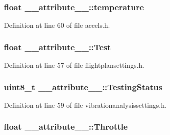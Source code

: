 \hypertarget{struct____attribute_____ad8ae98d5256d8f133d5e71db56f72cfe}{
\subsubsection[{temperature}]{\setlength{\rightskip}{0pt plus 5cm}float {\bf \-\_\-\-\_\-attribute\-\_\-\-\_\-\-::temperature}}}\label{struct____attribute_____ad8ae98d5256d8f133d5e71db56f72cfe}


\-Definition at line 60 of file accels.\-h.

\hypertarget{struct____attribute_____aca7172ae1a5e21256b33fe584ddfe075}{
\subsubsection[{\-Test}]{\setlength{\rightskip}{0pt plus 5cm}float {\bf \-\_\-\-\_\-attribute\-\_\-\-\_\-\-::\-Test}}}\label{struct____attribute_____aca7172ae1a5e21256b33fe584ddfe075}


\-Definition at line 57 of file flightplansettings.\-h.

\hypertarget{struct____attribute_____acbe90d47b9a9e3b7ac93c93af8412f5d}{
\subsubsection[{\-Testing\-Status}]{\setlength{\rightskip}{0pt plus 5cm}uint8\-\_\-t {\bf \-\_\-\-\_\-attribute\-\_\-\-\_\-\-::\-Testing\-Status}}}\label{struct____attribute_____acbe90d47b9a9e3b7ac93c93af8412f5d}


\-Definition at line 59 of file vibrationanalysissettings.\-h.

\hypertarget{struct____attribute_____a67f3a5b4ec90aa0d4dfb36cb9a3a2593}{
\subsubsection[{\-Throttle}]{\setlength{\rightskip}{0pt plus 5cm}float {\bf \-\_\-\-\_\-attribute\-\_\-\-\_\-\-::\-Throttle}}}\label{struct____attribute_____a67f3a5b4ec90aa0d4dfb36cb9a3a2593}


